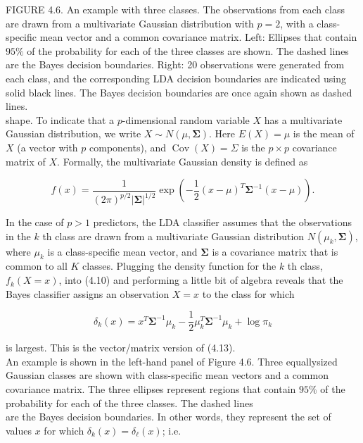 \documentclass[10pt]{article}
\begin{document}
FIGURE 4.6. An example with three classes. The observations from each class are drawn from a multivariate Gaussian distribution with $p=2$, with a class-specific mean vector and a common covariance matrix. Left: Ellipses that contain $95 \%$ of the probability for each of the three classes are shown. The dashed lines are the Bayes decision boundaries. Right: 20 observations were generated from each class, and the corresponding LDA decision boundaries are indicated using solid black lines. The Bayes decision boundaries are once again shown as dashed lines.\\
shape. To indicate that a $p$-dimensional random variable $X$ has a multivariate Gaussian distribution, we write $X \sim N(\mu, \boldsymbol{\Sigma})$. Here $E(X)=\mu$ is the mean of $X$ (a vector with $p$ components), and $\operatorname{Cov}(X)=\Sigma$ is the $p \times p$ covariance matrix of $X$. Formally, the multivariate Gaussian density is defined as


\begin{equation*}
f(x)=\frac{1}{(2 \pi)^{p / 2}|\boldsymbol{\Sigma}|^{1 / 2}} \exp \left(-\frac{1}{2}(x-\mu)^{T} \boldsymbol{\Sigma}^{-1}(x-\mu)\right) . \tag{4.18}
\end{equation*}


In the case of $p>1$ predictors, the LDA classifier assumes that the observations in the $k$ th class are drawn from a multivariate Gaussian distribution $N\left(\mu_{k}, \boldsymbol{\Sigma}\right)$, where $\mu_{k}$ is a class-specific mean vector, and $\boldsymbol{\Sigma}$ is a covariance matrix that is common to all $K$ classes. Plugging the density function for the $k$ th class, $f_{k}(X=x)$, into (4.10) and performing a little bit of algebra reveals that the Bayes classifier assigns an observation $X=x$ to the class for which


\begin{equation*}
\delta_{k}(x)=x^{T} \boldsymbol{\Sigma}^{-1} \mu_{k}-\frac{1}{2} \mu_{k}^{T} \boldsymbol{\Sigma}^{-1} \mu_{k}+\log \pi_{k} \tag{4.19}
\end{equation*}


is largest. This is the vector/matrix version of (4.13).\\
An example is shown in the left-hand panel of Figure 4.6. Three equallysized Gaussian classes are shown with class-specific mean vectors and a common covariance matrix. The three ellipses represent regions that contain $95 \%$ of the probability for each of the three classes. The dashed lines\\
are the Bayes decision boundaries. In other words, they represent the set of values $x$ for which $\delta_{k}(x)=\delta_{\ell}(x)$; i.e.
\end{document}
